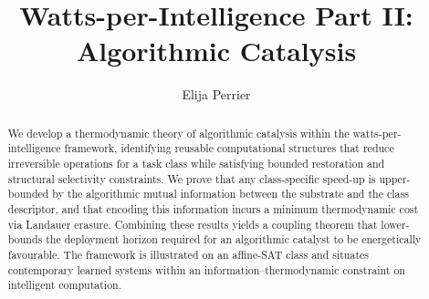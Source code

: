 \documentclass[runningheads]{llncs}
\begin{document}
\title{Watts-per-Intelligence Part II:\\Algorithmic Catalysis}
\author{Elija Perrier}

\maketitle

\begin{abstract}
We develop a thermodynamic theory of algorithmic catalysis within the watts-per-intelligence framework, identifying reusable computational structures that reduce irreversible operations for a task class while satisfying bounded restoration and structural selectivity constraints. We prove that any class-specific speed-up is upper-bounded by the algorithmic mutual information between the substrate and the class descriptor, and that encoding this information incurs a minimum thermodynamic cost via Landauer erasure. Combining these results yields a coupling theorem that lower-bounds the deployment horizon required for an algorithmic catalyst to be energetically favourable. The framework is illustrated on an affine-SAT class and situates contemporary learned systems within an information–thermodynamic constraint on intelligent computation.
\end{abstract}
\end{document}
